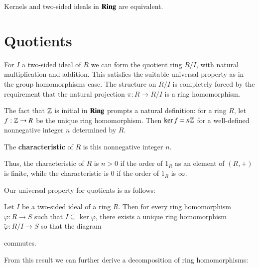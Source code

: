 \documentclass[12pt, a4paper, oneside, openright, titlepage]{book}
\begin{document}
Kernels and two-sided ideals in $\normalfont\textbf{Ring}$ are equivalent.


\section{Quotients}

For $I$ a two-sided ideal of $R$ we can form the quotient ring $R/I$, with natural multiplication and addition. This satisfies the suitable universal property as in the group homomorphisms case. The structure on $R/I$ is completely forced by the requirement that the natural projection $\pi:R\rightarrow R/I$ is a ring homomorphism. 

The fact that $\mathbb Z$ is initial in $\normalfont\textbf{Ring}$ prompts a natural definition: for a ring $R$, let $f:\mathbb Z\rightarrow R$ be the unique ring homomorphism. Then $\ker f = n\mathbb Z$ for a well-defined nonnegative integer $n$ determined by $R$.

\begin{defn}
    The \textbf{characteristic} of $R$ is this nonnegative integer $n$.
\end{defn}

Thus, the characteristic of $R$ is $n > 0$ if the order of $1_R$ as an element of $(R,+)$ is finite, while the characteristic is $0$ if the order of $1_R$ is $\infty$.

Our universal property for quotients is as follows:

\begin{thm}
    Let $I$ be a two-sided ideal of a ring $R$. Then for every ring homomorphism $\varphi:R\rightarrow S$ such that $I \subseteq \ker \varphi$, there exists a unique ring homomorphism $\widetilde{\varphi}:R/I\rightarrow  S$ so that the diagram
    \begin{center}
\end{center}
commutes.
\end{thm}


From this result we can further derive a decomposition of ring homomorphisms:
\end{document}
